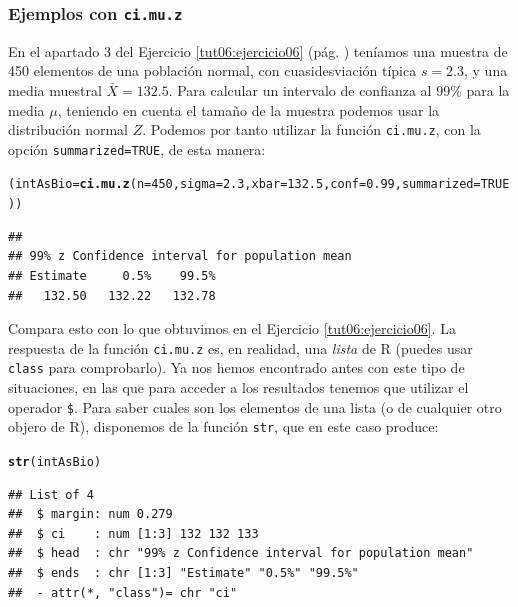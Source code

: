 \documentclass[10pt,a4paper]{article}\usepackage[]{graphicx}\usepackage[]{color}
\makeatletter
\newcommand{\hlnum}[1]{\textcolor[rgb]{0.686,0.059,0.569}{#1}}%
\newcommand{\hlstd}[1]{\textcolor[rgb]{0.345,0.345,0.345}{#1}}%
\newcommand{\hlkwb}[1]{\textcolor[rgb]{0.69,0.353,0.396}{#1}}%
\newcommand{\hlkwc}[1]{\textcolor[rgb]{0.333,0.667,0.333}{#1}}%
\newcommand{\hlkwd}[1]{\textcolor[rgb]{0.737,0.353,0.396}{\textbf{#1}}}%
\newenvironment{kframe}{%
 \def\at@end@of@kframe{}%
 \ifinner\ifhmode%
  \def\at@end@of@kframe{\end{minipage}}%
  \begin{minipage}{\columnwidth}%
 \fi\fi%
 \def\FrameCommand##1{\hskip\@totalleftmargin \hskip-\fboxsep
 \colorbox{shadecolor}{##1}\hskip-\fboxsep
     \hskip-\linewidth \hskip-\@totalleftmargin \hskip\columnwidth}%
 \MakeFramed {\advance\hsize-\width
   \@totalleftmargin\z@ \linewidth\hsize
   \@setminipage}}%
 {\par\unskip\endMakeFramed%
 \at@end@of@kframe}
\newenvironment{knitrout}{}{} %
\newcounter {cont01}
\makeatother
\begin{document}
\subsubsection*{Ejemplos con {\tt ci.mu.z}}

En el apartado 3 del Ejercicio \ref{tut06:ejercicio06} (pág. \pageref{tut06:ejercicio06}) teníamos una muestra de 450 elementos de una población normal, con cuasidesviación típica $s=2.3$, y una media muestral $\bar X=132.5$. Para calcular un intervalo de confianza al 99\% para la media $\mu$, teniendo en cuenta el tamaño de la muestra podemos usar la distribución normal $Z$.  Podemos por tanto utilizar la función {\tt ci.mu.z}, con la opción {\tt summarized=TRUE}, de esta manera:
\begin{knitrout}
\color{fgcolor}\begin{kframe}
\begin{alltt}
\hlstd{(intAsBio} \hlkwb{=} \hlkwd{ci.mu.z}\hlstd{(}\hlkwc{n}\hlstd{=}\hlnum{450}\hlstd{,} \hlkwc{sigma}\hlstd{=}\hlnum{2.3}\hlstd{,} \hlkwc{xbar}\hlstd{=}\hlnum{132.5}\hlstd{,} \hlkwc{conf}\hlstd{=}\hlnum{0.99}\hlstd{,} \hlkwc{summarized}\hlstd{=}\hlnum{TRUE}\hlstd{))}
\end{alltt}
\begin{verbatim}
## 
## 99% z Confidence interval for population mean 
## Estimate     0.5%    99.5% 
##   132.50   132.22   132.78
\end{verbatim}
\end{kframe}
\end{knitrout}
Compara esto con lo que obtuvimos en el Ejercicio \ref{tut06:ejercicio06}. La respuesta de la función {\tt ci.mu.z} es, en realidad, una {\em lista} de R (puedes usar {\tt class} para comprobarlo). Ya nos hemos encontrado antes con este tipo de situaciones, en las que para acceder a los resultados tenemos que utilizar el operador \verb/$/. Para saber cuales son los elementos de una lista (o de cualquier otro objero de R), disponemos de la función {\tt str}, que en este caso produce:
\begin{knitrout}
\color{fgcolor}\begin{kframe}
\begin{alltt}
\hlkwd{str}\hlstd{(intAsBio)}
\end{alltt}
\begin{verbatim}
## List of 4
##  $ margin: num 0.279
##  $ ci    : num [1:3] 132 132 133
##  $ head  : chr "99% z Confidence interval for population mean"
##  $ ends  : chr [1:3] "Estimate" "0.5%" "99.5%"
##  - attr(*, "class")= chr "ci"
\end{verbatim}
\end{kframe}
\end{knitrout}
\end{document}

